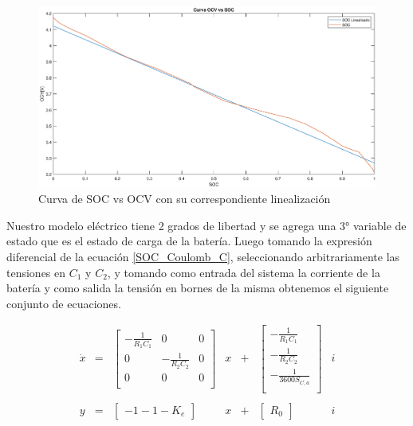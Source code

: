 \documentclass[10pt,a4paper]{article}
\begin{document}
    \begin{figure}[h!]
        \begin{center}
            \includegraphics[width=1\textwidth]{SOC_vs_OCV.eps}
            \caption{Curva de SOC vs OCV con su correspondiente linealización }
            \label{SOC_vs_OCV}
        \end{center}
    \end{figure}
    \FloatBarrier

    Nuestro modelo eléctrico tiene 2 grados de libertad y se agrega una 3° variable de estado que es el estado de carga de la batería. Luego tomando la expresión diferencial de la ecuación \ref{SOC_Coulomb_C}, seleccionando arbitrariamente las tensiones en $C_1$ y $C_2$, y tomando como entrada del sistema la corriente de la batería y como salida la tensión en bornes de la misma obtenemos el siguiente conjunto de ecuaciones.
    
    \begin{equation}
        \begin{array}{llcllcl}
            \dot{x} & = & \begin{bmatrix}
                -\frac{1}{R_1 C_1} &            0       & 0 \\
                0                  & -\frac{1}{R_2 C_2} & 0 \\
                0                  &            0       & 0 \\
            \end{bmatrix} & x & + &     \begin{bmatrix}
                -\frac{1}{R_1 C_1} \\
                -\frac{1}{R_2 C_2}  \\
                -\frac{1}{3600 S_{C,a}}\\
            \end{bmatrix} & i \\
            \\
            y & = & \begin{bmatrix}
                -1-1-K_e 
            \end{bmatrix} & x & + & \begin{bmatrix}
                R_0
            \end{bmatrix} & i \\
        \end{array}
    \end{equation}
	
\end{document}
